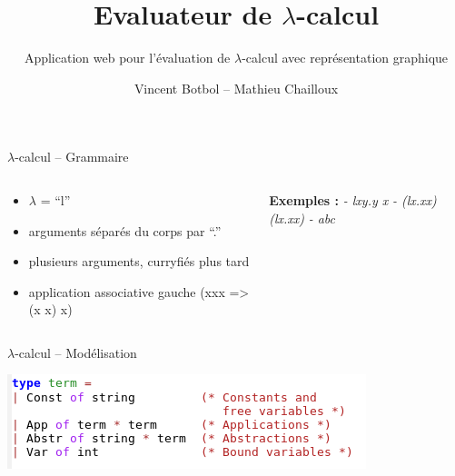 \documentclass{beamer}
\title{Evaluateur de $\lambda$-calcul}
\subtitle{Application web pour
  l'évaluation de $\lambda$-calcul avec représentation graphique}
\author{Vincent Botbol -- Mathieu Chailloux}
\begin{document}
\maketitle

\begin{frame}{$\lambda$-calcul -- Grammaire}
  \begin{columns}
    \begin{column}{5cm}
      \begin{itemize}
      \item $\lambda$ = ``l''
      \item arguments séparés du corps par ``.''
      \item plusieurs arguments, curryfiés plus tard
      \item application associative gauche (xxx => (x x) x)
      \end{itemize}
    \end{column}

    \begin{column}{5cm}
      \textbf{Exemples :}
      \linebreak
      \linebreak
      \textit{- lxy.y x}
      \linebreak
      \textit{- (lx.xx)(lx.xx)}
      \linebreak
      \textit{- abc}
    \end{column}

  \end{columns}

\end{frame}

\begin{frame}{$\lambda$-calcul -- Modélisation}

  \includegraphics{lambda2.png}

\end{frame}
\end{document}
